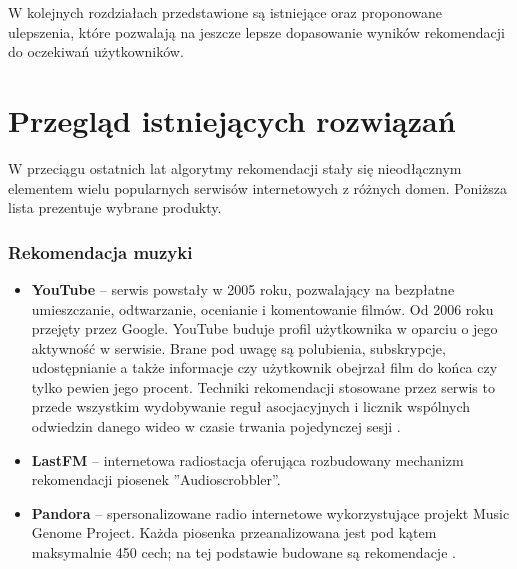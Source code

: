 \documentclass[twoside]{iisthesis}
\begin{document}
	 
	 W kolejnych rozdziałach przedstawione są istniejące oraz proponowane ulepszenia, które pozwalają na jeszcze lepsze dopasowanie wyników rekomendacji do oczekiwań użytkowników. 
	 
	 
 
 \chapter{Przegląd istniejących rozwiązań}
 
 	 
	 W przeciągu ostatnich lat algorytmy rekomendacji stały się nieodłącznym elementem wielu popularnych serwisów internetowych z różnych domen. Poniższa lista prezentuje wybrane produkty. 
	 
	 \subsection{Rekomendacja muzyki}
	 
	 \begin{itemize}
	 	\item \textbf{YouTube} -- serwis powstały w 2005 roku, pozwalający na bezpłatne umieszczanie, odtwarzanie, ocenianie i komentowanie filmów. Od 2006 roku przejęty przez Google. YouTube buduje profil użytkownika w oparciu o jego aktywność w serwisie. Brane pod uwagę są polubienia, subskrypcje, udostępnianie a także informacje czy użytkownik obejrzał film do końca czy tylko pewien jego procent. Techniki rekomendacji stosowane przez serwis to przede wszystkim wydobywanie reguł asocjacyjnych i licznik wspólnych odwiedzin danego wideo w czasie trwania pojedynczej sesji \cite{id:TheYouTubeVideoRecommendationSystem}. 
	 	\item \textbf{LastFM } -- internetowa radiostacja oferująca rozbudowany mechanizm rekomendacji piosenek ''Audioscrobbler''.   
	 	\item \textbf{Pandora}	-- spersonalizowane radio internetowe wykorzystujące projekt Music Genome Project. Każda piosenka przeanalizowana jest pod kątem maksymalnie 450 cech; na tej podstawie budowane są rekomendacje \cite{id:mgp}.
	 	
	 \end{itemize}
	 
\end{document}
